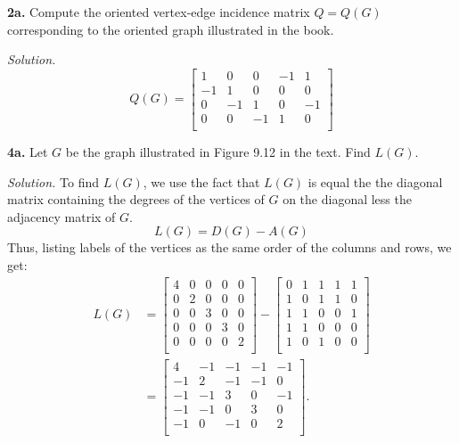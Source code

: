 \documentclass{article}
\begin{document}
\setlength{\parindent}{0cm}   %






\textbf{2a.} Compute the oriented vertex-edge incidence matrix \(Q=Q(G)\) corresponding to the oriented graph illustrated in the book. 


\vspace{3mm}
\textit{Solution.} \[
Q(G) = 
\begin{bmatrix}
1  &   0 &  0  & -1   &  1\\
 -1&	1&0	&0	&0	 \\
 0&-1	&	1&	0&	-1 \\
 0 &0	&	-1&	1&	0 \\
\end{bmatrix}
\]


\vspace{3mm}


\textbf{4a.} Let \(G\) be the graph illustrated in Figure 9.12 in the text. Find \(L(G)\). 

\vspace{3mm}
\textit{Solution.} To find \(L(G)\), we use the fact that \(L(G)\) is equal the the diagonal matrix containing the degrees of the vertices of \(G\) on the diagonal less the adjacency matrix of \(G\). 
\[
L(G) =  D(G) - A(G)
\]
Thus, listing labels of the vertices as the same order of the columns and rows, we get:
\begin{align*}
L(G) &=
\begin{bmatrix}
 4&0 &0 &0 & 0\\
  0&2 &0 & 0&0 \\
  0 & 0&3 & 0&0 \\
    0&0 & 0&3 &0 \\
     0&0 &0 & 0&2 \\
\end{bmatrix}-
\begin{bmatrix}
 0& 1&1 &1 & 1\\
  1& 0&1 &1 &0 \\
  1 &1 & 0&0 &1 \\
  1  &1 & 0& 0& 0\\
   1  & 0& 1& 0& 0\\
\end{bmatrix}\\
&=
\begin{bmatrix}
 4& -1&-1 &-1 & -1\\
  -1& 2&-1 &-1 &0 \\
  -1 &-1 & 3&0 &-1 \\
  -1  &-1 & 0& 3& 0\\
   -1  & 0& -1& 0& 2\\
\end{bmatrix}.
\end{align*}
\end{document}
